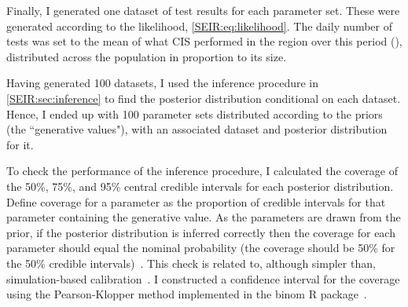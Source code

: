 \documentclass[thesis.tex]{subfiles}
\begin{document}
Finally, I generated one dataset of test results for each parameter set.
These were generated according to the likelihood, \cref{SEIR:eq:likelihood}.
The daily number of tests was set to the mean of what CIS performed in the region over this period (), distributed across the population in proportion to its size.

Having generated 100 datasets, I used the inference procedure in \cref{SEIR:sec:inference} to find the posterior distribution conditional on each dataset.
Hence, I ended up with 100 parameter sets distributed according to the priors (the ``generative values"), with an associated dataset and posterior distribution for it.

To check the performance of the inference procedure, I calculated the coverage of the 50\%, 75\%, and 95\% central credible intervals for each posterior distribution.
Define coverage for a parameter as the proportion of credible intervals for that parameter containing the generative value.
As the parameters are drawn from the prior, if the posterior distribution is inferred correctly then the coverage for each parameter should equal the nominal probability (\eg the coverage should be 50\% for the 50\% credible intervals)~\autocite{cookValidation}.
This check is related to, although simpler than, simulation-based calibration~\autocite{taltsValidating}.
I constructed a confidence interval for the coverage using the Pearson-Klopper method implemented in the binom R package~\autocite{binom1-1}.
\end{document}
